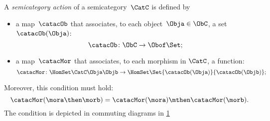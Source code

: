 \begin{ctdefinition}
    \label{def:semicategory-action}
    A \emph{semicategory action} of a semicategory~$\CatC$ is defined by
    \begin{itemize}
        \item a map~$\catacOb$ that associates, to each object~$\Obja \in \ObC$, a set~$\catacOb(\Obja)$:
              \begin{equation}
                  \catacOb \colon \ObC \to \Obof\Set;
              \end{equation}
        \item a map~$\catacMor$ that associates, to each morphism in $\CatC$, a function:
              \begin{equation}
                  \catacMor\colon \HomSet\CatC\Obja\Objb \to  \HomSet\Set{\catacOb(\Obja)}{\catacOb(\Objb) };
              \end{equation}
    \end{itemize}
    Moreover, this condition must hold:
    \begin{equation}
        \catacMor(\mora\then\morb) = \catacMor(\mora) \mthen \catacMor(\morb).
    \end{equation}
    The condition is depicted in commuting diagrams in \cref{fig:semicat_ac_comm}
\end{ctdefinition}

\begin{figure}
    \begin{center}
    \end{center}
    \caption{\label{fig:semicat_ac_comm}}
\end{figure}



